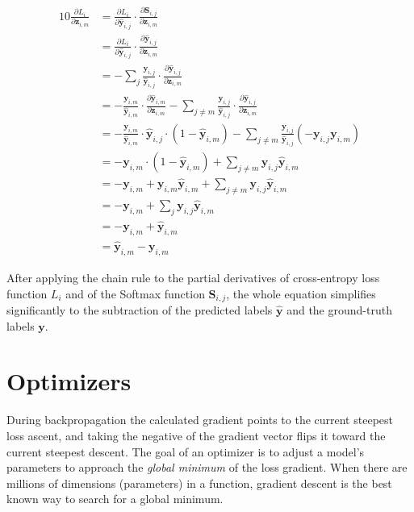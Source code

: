 \documentclass[a4paper]{article}
\newcommand{\matr}[1]{\mathbf{#1}}
\newcommand{\vect}[1]{\bm{#1}}
\newcommand{\yij}{\vect{y}_{i,j}}
\newcommand{\yhatij}{\vect{\hat{y}}_{i,j}}
\begin{document}
\begin{alignat*}{10}
    \frac{\partial L_i}{\partial \vect{z}_{i,m}} &= \frac{\partial L_i}{\partial \yhatij} \cdot \frac{\partial \matr{S}_{i,j}}{\partial \vect{z}_{i,m}} \\
    &= \frac{\partial L_i}{\partial \yhatij} \cdot \frac{\partial \yhatij}{\partial \vect{z}_{i,m}} \\
    &= -\sum_{j}\frac{\yij}{\yhatij} \cdot \frac{\partial \yhatij}{\partial \vect{z}_{i,m}} \\
    &= -\frac{\vect{y}_{i,m}}{\vect{\hat{y}}_{i,m}} \cdot \frac{\partial \vect{\hat{y}}_{i,m}}{\partial \vect{z}_{i,m}} - \sum_{j\not=m}\frac{\yij}{\yhatij} \cdot \frac{\partial\yhatij}{\partial\vect{z}_{i,m}} \\
    &= -\frac{\vect{y}_{i,m}}{\vect{\hat{y}}_{i,m}} \cdot \yhatij \cdot (1 - \vect{\hat{y}}_{i,m}) - \sum_{j\not=m}\frac{\yij}{\yhatij}(-\yij\vect{y}_{i,m}) \\
    &= -\vect{y}_{i,m} \cdot (1 - \vect{\hat{y}}_{i,m}) + \sum_{j\not=m}\yij\vect{\hat{y}}_{i,m} \\
    &= -\vect{y}_{i,m} + \vect{y}_{i,m} \vect{\hat{y}}_{i,m} + \sum_{j\not=m}\yij\vect{\hat{y}}_{i,m} \\
    &= -\vect{y}_{i,m} + \sum_{j}\yij\vect{\hat{y}}_{i,m} \\
    &= -\vect{y}_{i,m} + \vect{\hat{y}}_{i,m} \\
    &= \vect{\hat{y}}_{i,m} - \vect{y}_{i,m}
\end{alignat*}

After applying the chain rule to the partial derivatives of cross-entropy loss function $L_i$ and of the Softmax function $\matr{S}_{i,j}$, the whole equation simplifies significantly to the subtraction of the predicted labels $\vect{\hat{y}}$ and the ground-truth labels $\vect{y}$.

\pagebreak
\section*{Optimizers}
During backpropagation the calculated gradient points to the current steepest loss ascent, and taking the negative of the gradient vector flips it toward the current steepest descent. The goal of an optimizer is to adjust a model's parameters to approach the \emph{global minimum} of the loss gradient. When there are millions of dimensions (parameters) in a function, gradient descent is the best known way to search for a global minimum.
\end{document}
